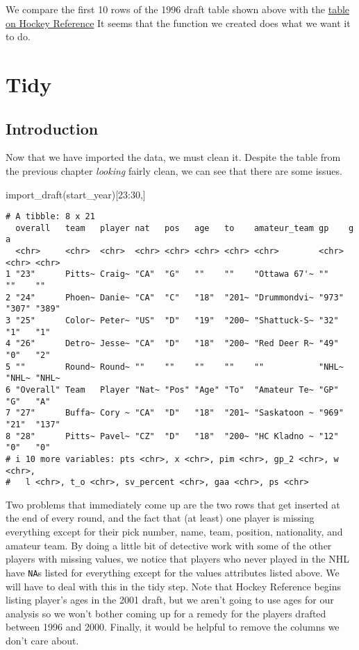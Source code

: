 \documentclass[
  letterpaper,
  DIV=11,
  numbers=noendperiod]{scrreprt}
\newenvironment{Shaded}{\begin{snugshade}}{\end{snugshade}}
\newcommand{\DecValTok}[1]{\textcolor[rgb]{0.68,0.00,0.00}{#1}}
\newcommand{\FunctionTok}[1]{\textcolor[rgb]{0.28,0.35,0.67}{#1}}
\newcommand{\NormalTok}[1]{\textcolor[rgb]{0.00,0.23,0.31}{#1}}
\newcommand{\SpecialCharTok}[1]{\textcolor[rgb]{0.37,0.37,0.37}{#1}}
\begin{document}
We compare the first 10 rows of the 1996 draft table shown above with
the
\href{https://www.hockey-reference.com/draft/NHL_1996_entry.html}{table
on Hockey Reference} It seems that the function we created does what we
want it to do.


\chapter{Tidy}\label{tidy}

\section{Introduction}\label{introduction-1}

Now that we have imported the data, we must clean it. Despite the table
from the previous chapter \emph{looking} fairly clean, we can see that
there are some issues.

\begin{Shaded}
\begin{Highlighting}[]
\FunctionTok{import\_draft}\NormalTok{(start\_year)[}\DecValTok{23}\SpecialCharTok{:}\DecValTok{30}\NormalTok{,]}
\end{Highlighting}
\end{Shaded}

\begin{verbatim}
# A tibble: 8 x 21
  overall   team   player nat   pos   age   to    amateur_team gp    g     a    
  <chr>     <chr>  <chr>  <chr> <chr> <chr> <chr> <chr>        <chr> <chr> <chr>
1 "23"      Pitts~ Craig~ "CA"  "G"   ""    ""    "Ottawa 67'~ ""    ""    ""   
2 "24"      Phoen~ Danie~ "CA"  "C"   "18"  "201~ "Drummondvi~ "973" "307" "389"
3 "25"      Color~ Peter~ "US"  "D"   "19"  "200~ "Shattuck-S~ "32"  "1"   "1"  
4 "26"      Detro~ Jesse~ "CA"  "D"   "18"  "200~ "Red Deer R~ "49"  "0"   "2"  
5 ""        Round~ Round~ ""    ""    ""    ""    ""           "NHL~ "NHL~ "NHL~
6 "Overall" Team   Player "Nat~ "Pos" "Age" "To"  "Amateur Te~ "GP"  "G"   "A"  
7 "27"      Buffa~ Cory ~ "CA"  "D"   "18"  "201~ "Saskatoon ~ "969" "21"  "137"
8 "28"      Pitts~ Pavel~ "CZ"  "D"   "18"  "200~ "HC Kladno ~ "12"  "0"   "0"  
# i 10 more variables: pts <chr>, x <chr>, pim <chr>, gp_2 <chr>, w <chr>,
#   l <chr>, t_o <chr>, sv_percent <chr>, gaa <chr>, ps <chr>
\end{verbatim}

Two problems that immediately come up are the two rows that get inserted
at the end of every round, and the fact that (at least) one player is
missing everything except for their pick number, name, team, position,
nationality, and amateur team. By doing a little bit of detective work
with some of the other players with missing values, we notice that
players who never played in the NHL have \texttt{NA}s listed for
everything except for the values attributes listed above. We will have
to deal with this in the tidy step. Note that Hockey Reference begins
listing player's ages in the 2001 draft, but we aren't going to use ages
for our analysis so we won't bother coming up for a remedy for the
players drafted between 1996 and 2000. Finally, it would be helpful to
remove the columns we don't care about.
\end{document}
